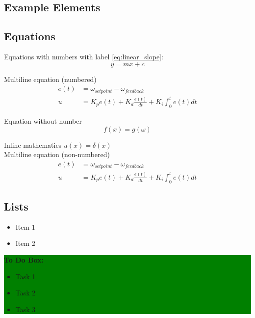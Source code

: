 \documentclass[12pt]{article}
\numberwithin{equation}{section} %
\numberwithin{figure}{section} %
\numberwithin{table}{section} %
\newcommand{\hlc}[2][yellow]{ {\sethlcolor{#1} \hl{#2}} } %
\begin{document}
\begin{appendices}
\section{Example Elements}
\label{appen:exElements}


\subsection{Equations}

 Equations with numbers with label \ref{eq:linear_slope}:
\begin{equation}
\label{eq:linear_slope}
 y=mx+c
\end{equation} 


 
Multiline equation (numbered) \\
\begin{equation}
  \label{eq:kinetics}
  \begin{split}
  e(t) &= \omega_{setpoint} - \omega_{feedback} \\
  u &= K_p e(t) + K_d \frac{e(t)}{dt} + K_i \int^{t}_{0} e(t) dt
\end{split}
\end{equation} 

Equation without number 
\[
f(x)=g(\omega)
\]
 
Inline mathematics $u(x)=\delta(x)$ \\
 
Multiline equation (non-numbered) \\
\[
\begin{split}
e(t) &= \omega_{setpoint} - \omega_{feedback} \\
u &= K_p e(t) + K_d \frac{e(t)}{dt} + K_i \int^{t}_{0} e(t) dt
\end{split}
\]


\subsection{Lists}

 \begin{itemize}[leftmargin=1.2cm]
	\item  Item 1
	\item  Item 2
\end{itemize} 
 
 \vspace {10mm}

\colorbox{green}{%
\parbox{\linewidth}{%
\textbf{To Do Box:}
\begin{itemize}[leftmargin=1cm]
  \item  Task 1
  \item  Task 2
  \item  Task 3
\end{itemize}%
  }%
} %
\vspace{5mm}


\end{appendices}
\end{document}
